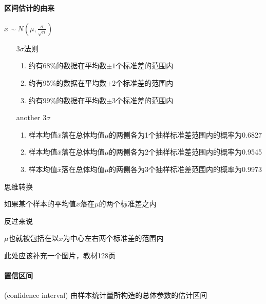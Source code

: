 \documentclass[UTF8,10pt]{book}
\begin{document}
            \paragraph{区间估计的由来} $\overline{x} \sim N(\mu,\frac{\sigma}{\sqrt{n}})$
                \begin{itemize}
                    \item [$3\sigma$法则] {
                        \begin{enumerate}
                            \item 约有68\%的数据在平均数$\pm 1$个标准差的范围内
                            \item 约有95\%的数据在平均数$\pm 2$个标准差的范围内
                            \item 约有99\%的数据在平均数$\pm 3$个标准差的范围内
                        
                        \end{enumerate}
                    }
                \end{itemize}

                \begin{itemize}
                    \item [another $3\sigma$] {
                        \begin{enumerate}
                            \item 样本均值$\overline{x}$落在总体均值$\mu$的两侧各为1个抽样标准差范围内的概率为0.6827
                            \item 样本均值$\overline{x}$落在总体均值$\mu$的两侧各为2个抽样标准差范围内的概率为0.9545
                            \item 样本均值$\overline{x}$落在总体均值$\mu$的两侧各为3个抽样标准差范围内的概率为0.9973
                        
                        \end{enumerate}
                    }
                \end{itemize}

                {\kaishu 思维转换

                如果某个样本的平均值$\overline{x}$落在$\mu$的两个标准差之内

                反过来说

                $\mu$也就被包括在以$\overline{x}$为中心左右两个标准差的范围内}

                此处应该补充一个图片，教材128页

            \paragraph{置信区间} (confidence interval) 由样本统计量所构造的总体参数的估计区间
\end{document}
